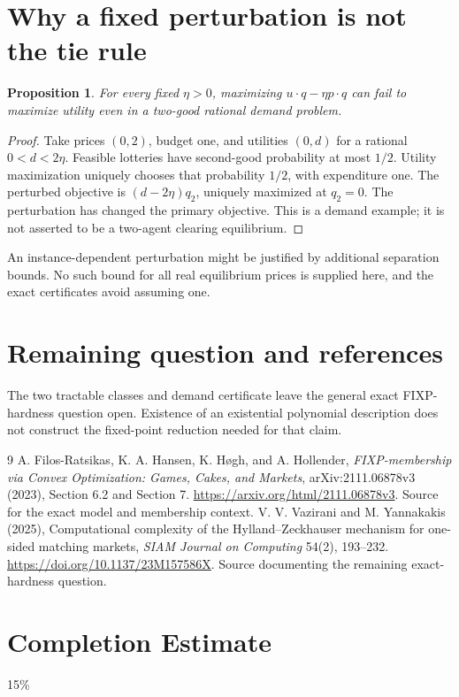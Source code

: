 \documentclass[11pt,a4paper]{article}
\newtheorem{proposition}[theorem]{Proposition}
\theoremstyle{definition}
\theoremstyle{remark}
\begin{document}
\section{Why a fixed perturbation is not the tie rule}
\begin{proposition}
For every fixed $\eta>0$, maximizing $u\cdot q-\eta p\cdot q$ can fail to maximize utility even in a two-good rational demand problem.
\end{proposition}
\begin{proof}
Take prices $(0,2)$, budget one, and utilities $(0,d)$ for a rational $0<d<2\eta$. Feasible lotteries have second-good probability at most $1/2$. Utility maximization uniquely chooses that probability $1/2$, with expenditure one. The perturbed objective is $(d-2\eta)q_2$, uniquely maximized at $q_2=0$. The perturbation has changed the primary objective. This is a demand example; it is not asserted to be a two-agent clearing equilibrium.
\end{proof}
An instance-dependent perturbation might be justified by additional separation bounds. No such bound for all real equilibrium prices is supplied here, and the exact certificates avoid assuming one.
\section{Remaining question and references}
The two tractable classes and demand certificate leave the general exact FIXP-hardness question open. Existence of an existential polynomial description does not construct the fixed-point reduction needed for that claim.
\begin{thebibliography}{9}
 A. Filos-Ratsikas, K. A. Hansen, K. H\o gh, and A. Hollender, \emph{FIXP-membership via Convex Optimization: Games, Cakes, and Markets}, arXiv:2111.06878v3 (2023), Section 6.2 and Section 7. \url{https://arxiv.org/html/2111.06878v3}. Source for the exact model and membership context.
 V. V. Vazirani and M. Yannakakis (2025), Computational complexity of the Hylland--Zeckhauser mechanism for one-sided matching markets, \emph{SIAM Journal on Computing} 54(2), 193--232. \url{https://doi.org/10.1137/23M157586X}. Source documenting the remaining exact-hardness question.
\end{thebibliography}

\section{Completion Estimate}
15\%
\end{document}
